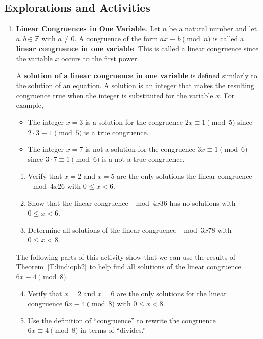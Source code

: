 \subsection*{Explorations and Activities}
\setcounter{oldenumi}{\theenumi}
\begin{enumerate} \setcounter{enumi}{\theoldenumi}
\item \textbf{Linear Congruences in One Variable}.  Let $n$ be a natural number and let $a, b \in \mathbb{Z}$ with $a \ne 0$.  A congruence of the form $ax \equiv b \pmod n$ is called a \textbf{linear congruence in one variable}.  \label{A:lincongruence}
%
This is called a linear congruence since the variable $x$ occurs to the first power.  

A \textbf{solution of a linear congruence in one variable} is defined similarly to the solution of an equation.  A solution is an integer that makes the resulting congruence true when the integer is substituted for the variable $x$.  For example,

\begin{itemize}
\item The integer $x = 3$ is a solution for the congruence 
$2x \equiv 1 \pmod 5$ since $2 \cdot 3 \equiv 1 \pmod 5$ is a true congruence.

\item The integer $x = 7$ is not a solution for the congruence 
$3x \equiv 1 \pmod 6$ since $3 \cdot 7 \equiv 1 \pmod 6$ is a not a true congruence.

\end{itemize}

\begin{enumerate}
\item Verify that $x = 2$ and $x = 5$ are the only solutions the linear congruence $\mod{4x}{2}{6}$ with 
$0 \leq x < 6$.

\item Show that the linear congruence $\mod{4x}{3}{6}$ has no solutions with $0 \leq x < 6$. \label{lincongruence2}
\item Determine all solutions of the linear congruence $\mod{3x}{7}{8}$ with $0 \leq x < 8$.  

\end{enumerate}
The following parts of this activity show that we can use the results of Theorem~\ref{T:lindioph2} to help find all solutions of the linear congruence 
$6x \equiv 4 \pmod 8$.

\begin{enumerate}
\setcounter{enumii}{3}
\item Verify that $x = 2$ and $x = 6$ are the only solutions for the linear congruence 
$6x \equiv 4 \pmod 8$ with $0 \leq x < 8$. \label{lincongruence1}
\item Use the definition of ``congruence'' to rewrite the congruence \linebreak
$6x \equiv 4 \pmod 8$ in terms of ``divides.'' \label{lincongruence2}


\end{enumerate}
\end{enumerate}
